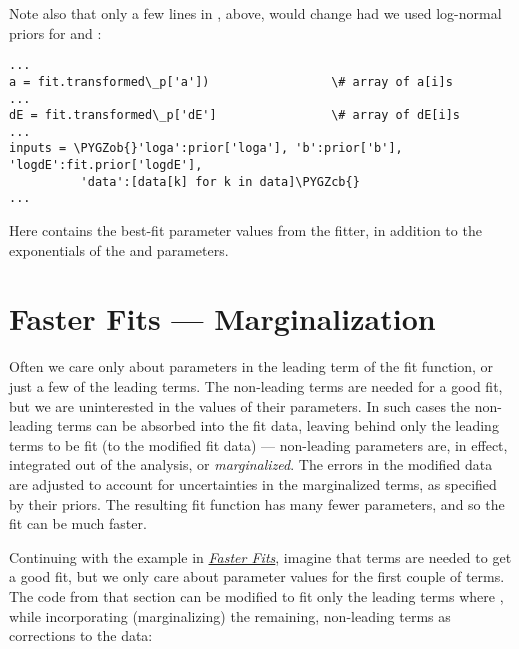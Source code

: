 \documentclass[letterpaper,10pt,english]{sphinxmanual}
\def\PYGZob{\char`\{}
\def\PYGZcb{\char`\}}
\begin{document}
Note also that only a few lines in , above,
would change had we used log-normal priors for  and :

\begin{Verbatim}[commandchars=\\\{\}]
...
a = fit.transformed\_p['a'])                 \# array of a[i]s
...
dE = fit.transformed\_p['dE']                \# array of dE[i]s
...
inputs = \PYGZob{}'loga':prior['loga'], 'b':prior['b'], 'logdE':fit.prior['logdE'],
          'data':[data[k] for k in data]\PYGZcb{}
...
\end{Verbatim}

Here  contains the best-fit parameter values from the
fitter, in addition to the exponentials of the  and 
parameters.


\section{Faster Fits --- Marginalization}
\label{corrfitter:marginalized-fits}\label{corrfitter:faster-fits-marginalization}
Often we care only about parameters in the leading term of the fit function,
or just a few of the leading terms. The non-leading terms are needed for a
good fit, but we are uninterested in the values of their parameters. In such
cases the non-leading terms can be absorbed into the fit data, leaving behind
only the leading terms to be fit (to the modified fit data) --- non-leading
parameters are, in effect, integrated out of the analysis, or \emph{marginalized}.
The errors in the modified data are adjusted to account for uncertainties in
the marginalized terms, as specified by their priors. The resulting fit
function has many fewer parameters, and so the fit can be much faster.

Continuing with the example in {\hyperref[corrfitter:faster-fits]{\emph{Faster Fits}}}, imagine that 
terms are needed to get a good fit, but we only care about parameter values
for the first couple of terms. The code from that section can be modified to
fit only the leading  terms where , while incorporating
(marginalizing) the remaining, non-leading terms as corrections to the data:
\end{document}
